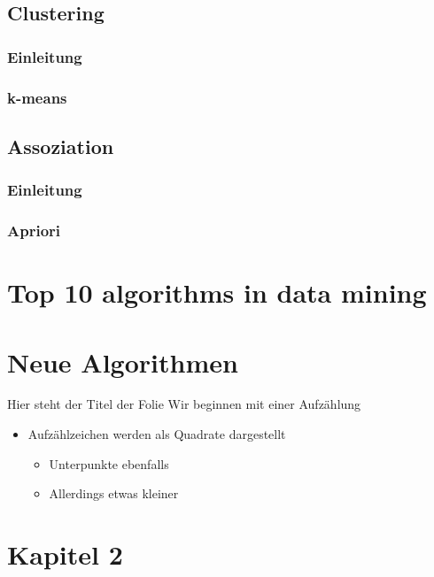 \documentclass[fleqn,11pt,aspectratio=43]{beamer}
\begin{document}
\subsection{Clustering}
\subsubsection{Einleitung}
\subsubsection{k-means}
\subsection{Assoziation}
\subsubsection{Einleitung}
\subsubsection{Apriori}
\section{Top 10 algorithms in data mining}
\section{Neue Algorithmen}

\begin{frame}{Hier steht der Titel der Folie}
Wir beginnen mit einer Aufzählung
\begin{itemize}
  \item Aufzählzeichen werden als Quadrate dargestellt
  \begin{itemize}
    \item Unterpunkte ebenfalls
    \item Allerdings etwas kleiner
  \end{itemize}
\end{itemize}
\end{frame}

\section{Kapitel 2}
\end{document}
